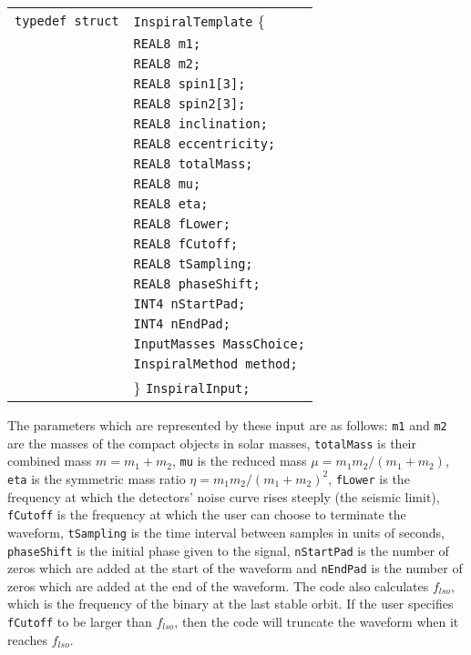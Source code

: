 \documentclass[12pt]{article}
\begin{document}
\begin{tabular}{ll}
\texttt{typedef struct} & \texttt{InspiralTemplate} \{ \\
                        & \texttt{REAL8 m1;} \\
                        & \texttt{REAL8 m2;}  \\
                        & \texttt{REAL8 spin1[3];}  \\
                        & \texttt{REAL8 spin2[3];}  \\
                        & \texttt{REAL8 inclination;}  \\
                        & \texttt{REAL8 eccentricity;}  \\
                        & \texttt{REAL8 totalMass;} \\
                        & \texttt{REAL8 mu;}  \\
                        & \texttt{REAL8 eta;}  \\
                        & \texttt{REAL8 fLower;}  \\
                        & \texttt{REAL8 fCutoff;}  \\
                        & \texttt{REAL8 tSampling;}  \\
                        & \texttt{REAL8 phaseShift;} \\
                        & \texttt{INT4  nStartPad;}  \\
                        & \texttt{INT4  nEndPad;}  \\
                        & \texttt{InputMasses MassChoice;}  \\
                        & \texttt{InspiralMethod method;}  \\
                        & \} \texttt{InspiralInput;}
\end{tabular}

\vspace{5mm}

The parameters which are represented by these input are as follows: \texttt{m1} and \texttt{m2} are the masses of the compact objects in solar masses, \texttt{totalMass} is their combined mass $m=m_{1}+m_{2}$, \texttt{mu} is the reduced mass $\mu=m_{1}m_{2}/(m_{1}+m_{2})$, \texttt{eta} is the symmetric mass ratio $\eta=m_{1}m_{2}/(m_{1}+m_{2})^{2}$, \texttt{fLower} is the frequency at which the detectors' noise curve rises steeply (the seismic limit), \texttt{fCutoff} is the frequency at which the user can choose to terminate the waveform, \texttt{tSampling} is the time interval between samples in units of seconds, \texttt{phaseShift} is the initial phase given to the signal, \texttt{nStartPad} is the number of zeros which are added at the start of the waveform and \texttt{nEndPad} is the number of zeros which are added at the end of the waveform. The code also calculates $f_{lso}$, which is the frequency of the binary at the last stable orbit. If the user specifies \texttt{fCutoff} to be larger than $f_{lso}$, then the code will truncate the waveform when it reaches $f_{lso}$. 
\end{document}
